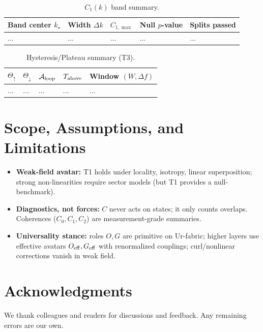 \documentclass[12pt,a4paper,oneside]{scrreprt}
\begin{document}
\begin{table}[htbp]\centering
\caption{$C_1(k)$ band summary.}
\begin{tabular}{lllll}\toprule
Band center $k_\star$ & Width $\Delta k$ & $C_{1,\max}$ & Null $p$-value & Splits passed \\\midrule
... & ... & ... & ... & ...\\ \bottomrule
\end{tabular}
\end{table}

\begin{table}[htbp]\centering
\caption{Hysteresis/Plateau summary (T3).}
\begin{tabular}{lllll}\toprule
$\Theta_\uparrow$ & $\Theta_\downarrow$ & $\mathcal A_{\rm loop}$ & $T_{\rm above}$ & Window $(W,\Delta f)$ \\\midrule
... & ... & ... & ... & ...\\ \bottomrule
\end{tabular}
\end{table}

\chapter{Scope, Assumptions, and Limitations}\label{app:limits}
\begin{itemize}
\item \textbf{Weak-field avatar:} T1 holds under locality, isotropy, linear superposition; strong non-linearities require sector models (but T1 provides a null-benchmark).
\item \textbf{Diagnostics, not forces:} $C$ never acts on states; it only counts overlaps. Coherences ($C_0,C_1,C_2$) are measurement-grade summaries.
\item \textbf{Universality stance:} roles $O,G$ are primitive on Ur-fabric; higher layers use effective avatars $O_{\rm eff},G_{\rm eff}$ with renormalized couplings; curl/nonlinear corrections vanish in weak field.
\end{itemize}


\chapter*{Acknowledgments}
We thank colleagues and readers for discussions and feedback. Any remaining errors are our own.
\end{document}
